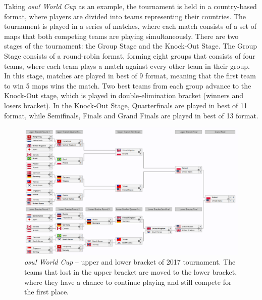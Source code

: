 Taking \textit{osu! World Cup} as an example, the tournament is held in a country-based format, where players are divided into teams representing their countries. The tournament is played in a series of matches, where each match consists of a set of maps that both competing teams are playing simultaneously. There are two stages of the tournament: the Group Stage and the Knock-Out Stage. The Group Stage consists of a round-robin format, forming eight groups that consists of four teams, where each team plays a match against every other team in their group. In this stage, matches are played in best of 9 format, meaning that the first team to win 5 maps wins the match. Two best teams from each group advance to the Knock-Out stage, which is played in double-elimination bracket (winners and losers bracket). In the Knock-Out Stage, Quarterfinals are played in best of 11 format, while Semifinals, Finals and Grand Finals are played in best of 13 format.

\begin{figure}[h]
    \centering\includegraphics[scale=0.15]{obrazki/osuworldcup.png}
    \caption{\textit{osu! World Cup} -- upper and lower bracket of 2017 tournament. The teams that lost in the upper bracket are moved to the lower bracket, where they have a chance to continue playing and still compete for the first place. \cite{2017osu}}
    \label{fig:osuworldcup}
\end{figure}

